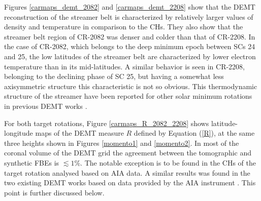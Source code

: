 \documentclass[namedreferences]{solarphysics}
\begin{document}
\begin{article}
{{Figures \ref{carmaps_demt_2082} and \ref{carmaps_demt_2208} show that} the DEMT reconstruction of the streamer belt is characterized by relatively larger values of density and temperature in comparison to the CHs. They also show that the streamer belt region of CR-2082 was denser and colder than  that of CR-2208.} In the case of CR-2082, which belongs to the deep minimum epoch between {SCs 24 and 25}, the {low latitudes of the streamer belt are characterized by lower electron temperature than in its mid-latitudes.} A similar behavior is seen in CR-2208, belonging to the declining phase of {SC 25, but having a {somewhat less axisymmetric} structure this characteristic is not so obvious. This thermodynamic structure} of the streamer have been reported for other solar minimum rotations in previous DEMT works \citep{lloveras_2017,nuevo_2013,vasquez_2010}.

{For both target rotations, Figure \ref{carmaps_R_2082_2208} shows {latitude-longitude} maps of {the DEMT} measure $R$ defined by Equation (\ref{R}), at the same three heights shown in Figures \ref{momento1} and \ref{momento2}. In most of the coronal volume of the DEMT grid the agreement between the tomographic and synthetic FBEs is $\lesssim 1\%$. The notable exception is to be found in the CHs of the target rotation {analysed} based on AIA data. A similar results was found in the two existing DEMT works based on data provided by the AIA instrument \citep{nuevo_2015,maccormack_2017}. This point is further discussed below.}


\end{article}
\end{document}
